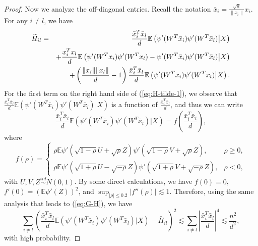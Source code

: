 \begin{proof}
Now we analyze the off-diagonal entries. Recall the notation $\bar{x}_i=\frac{\sqrt{d}}{\|x_i\|}x_i$. For any $i\neq l$, we have
\begin{eqnarray}
\label{eq:H-tilde-1} \wt{H}_{il} &=& \frac{\bar{x}_i^T\bar{x}_l}{d}\mathbb{E}\left(\psi'(W^T\bar{x}_i)\psi'(W^T\bar{x}_l)\big|X\right) \\
\label{eq:H-tilde-2} && + \frac{x_i^Tx_l}{d}\mathbb{E}\left(\psi'(W^T{x}_i)\psi'(W^T{x}_l)-\psi'(W^T\bar{x}_i)\psi'(W^T\bar{x}_l)\big|X\right) \\
\label{eq:H-tilde-3} && + \left(\frac{\|x_i\|\|x_l\|}{d}-1\right)\frac{\bar{x}_i^T\bar{x}_l}{d}\mathbb{E}\left(\psi'(W^T\bar{x}_i)\psi'(W^T\bar{x}_l)\big|X\right).
\end{eqnarray}
For the first term on the right hand side of (\ref{eq:H-tilde-1}), we observe that $\frac{\bar{x}_i^T\bar{x}_l}{d}\mathbb{E}\left(\psi'(W^T\bar{x}_i)\psi'(W^T\bar{x}_l)\big|X\right)$ is a function of $\frac{\bar{x}_i^T\bar{x}_l}{d}$, and thus we can write
$$\frac{\bar{x}_i^T\bar{x}_l}{d}\mathbb{E}\left(\psi'(W^T\bar{x}_i)\psi'(W^T\bar{x}_l)\big|X\right)=f\left(\frac{\bar{x}_i^T\bar{x}_l}{d}\right),$$
where
$$f(\rho)=\begin{cases}
\rho\mathbb{E}\psi'(\sqrt{1-\rho}U+\sqrt{\rho}Z)\psi'(\sqrt{1-\rho}V+\sqrt{\rho}Z), & \rho \geq 0, \\
\rho\mathbb{E}\psi'(\sqrt{1+\rho}U-\sqrt{-\rho}Z)\psi'(\sqrt{1+\rho}V+\sqrt{-\rho}Z), & \rho < 0,
\end{cases}$$
with $U,V,Z\stackrel{iid}{\sim} N(0,1)$. By some direct calculations, we have $f(0)=0$, $f'(0)=(\mathbb{E}\psi'(Z))^2$, and $\sup_{|\rho|\leq 0.2}|f''(\rho)|\lesssim 1$. Therefore, using the same analysis that leads to (\ref{eq:G-H}), we have
$$\sum_{i\neq l}\left(\frac{\bar{x}_i^T\bar{x}_l}{d}\mathbb{E}\left(\psi'(W^T\bar{x}_i)\psi'(W^T\bar{x}_l)\big|X\right)-\bar{H}_{il}\right)^2 \lesssim \sum_{i\neq l}\left|\frac{\bar{x}_i^T\bar{x}_l}{d}\right|^4\lesssim \frac{n^2}{d^2},$$
with high probability.


\end{proof}
